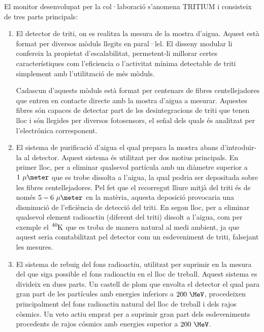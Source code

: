 El monitor desenvolupat per la col·laboració s'anomena TRITIUM i consisteix de tres parts principals:

\begin{enumerate}

\item{} El detector de triti, on es realitza la mesura de la mostra d'aigua. Aquest està format per diversos mòduls llegits en paral·lel. El disseny modular li confereix la propietat d'escalabilitat, permetent-li millorar certes característiques com l'eficiencia o l'activitat mínima detectable de triti simplement amb l'utilització de més mòduls.

Cadascun d'aquests mòduls està format per centenars de fibres centellejadores que entren en contacte directe amb la mostra d'aigua a mesurar. Aquestes fibres són capaces de detectar part de les desintegracions de triti que tenen lloc i són llegides per diversos fotosensors, el señal dels quals és analitzat per l'electrónica corresponent.

\item{} El sistema de purificació d'aigua el qual prepara la mostra abans d'introduir-la al detector. Aquest sistema és utilitzat per dos motius principals. En primer lloc, per a eliminar qualsevol partícula amb un diàmetre superior a $1~\mu\meter$ que es trobe dissolta a l'aigua, la qual podria ser depositada sobre les fibres centellejadores. Pel fet que el recorregut lliure mitjà del triti és de només $5-6~\mu\meter$ en la matèria, aquesta deposició provocaria una disminució de l'eficiència de detecció del triti. En segon lloc, per a eliminar qualsevol element radioactiu (diferent del triti) dissolt a l'aigua, com per exemple el $\ce{^{40}K}$ que es troba de manera natural al medi ambient, ja que aquest seria comtabilitzat pel detector com un esdeveniment de triti, falsejant les mesures.

\item{} El sistema de rebuig del fons radioactiu, utilitzat per suprimir en la mesura del que siga possible el fons radioactiu en el lloc de treball. Aquest sistema es divideix en dues parts. Un castell de plom que envolta el detector el qual para gran part de les partícules amb energies inferiors a $200~\MeV$, procedeixen principalment del fons radioactiu natural del lloc de treball i dels rajos còsmics. Un veto actiu emprat per a suprimir gran part dels esdeveniments procedents de rajos cósmics amb energies superior a $200~\MeV$.

\end{enumerate}

